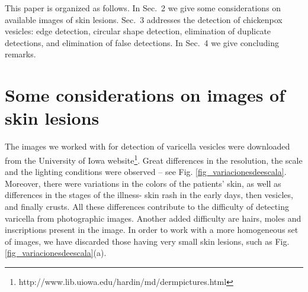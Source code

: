 \documentclass[oribibl]{llncs}
\begin{document}
This paper is organized as follows. In Sec.~2 we give some considerations on available images of skin lesions. Sec.~3 addresses the detection of chickenpox vesicles: edge detection, circular shape detection, elimination of duplicate detections, and elimination of false detections. In Sec.~4 we give concluding remarks.
\section{Some considerations on images of skin lesions}
The images we worked with for detection of varicella vesicles were downloaded from the University of Iowa website\footnote{http://www.lib.uiowa.edu/hardin/md/dermpictures.html}. %
Great differences in the resolution, the scale and the lighting conditions were observed -- see Fig. \ref{fig_variacionesdeescala}. 
Moreover, there were variations
 in the colors of the patients' skin, as well as differences in the stages of the illness- skin rash in the early days, then vesicles, and finally crusts. All these differences contribute to the  difficulty  of detecting varicella from photographic images. 
Another added difficulty are hairs, moles and inscriptions present in the image.
In order to work with a more homogeneous set of images, we have discarded those having very small skin lesions, such as Fig. \ref{fig_variacionesdeescala}(a).
\end{document}
